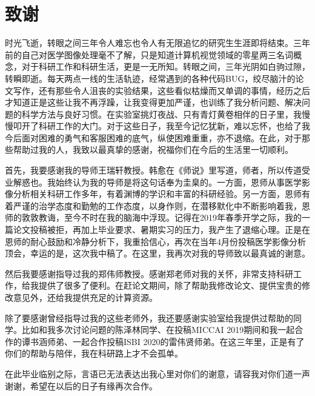 \chapter{致谢}


时光飞逝，转眼之间三年令人难忘也令人有无限追忆的研究生生涯即将结束。三年前的自己对医学图像处理毫不了解，只是知道计算机视觉领域的零星两三名词概念，对于科研工作和科研生活，更是一无所知。转眼之间，三年光阴如白驹过隙，转瞬即逝。每天两点一线的生活轨迹，经常遇到的各种代码BUG，绞尽脑汁的论文写作，还有那些令人沮丧的实验结果，这些看似枯燥而又单调的事情，经历之后才知道正是这些让我不再浮躁，让我变得更加严谨，也训练了我分析问题、解决问题的科学方法与良好习惯。在实验室挑灯夜战、只有青灯黄卷相伴的日子里，我慢慢叩开了科研工作的大门。对于这些日子，我至今记忆犹新，难以忘怀，也给了我今后面对困难的勇气和客服困难的底气，纵使困难重重，亦不退缩。在此，对于那些帮助过我的人，我致以最真挚的感谢，祝福你们在今后的生活里一切顺利。

首先，我要感谢我的导师王瑞轩教授。韩愈在《师说》里写道，师者，所以传道受业解惑也。我始终认为我的导师是将这句话奉为圭臬的。一方面，恩师从事医学影像分析相关科研工作多年，有着渊博的学识和丰富的科研经验。另一方面，恩师有着严谨的治学态度和勤勉的工作态度，以身作则，在潜移默化中不断影响着我，恩师的敦敦教诲，至今不时在我的脑海中浮现。记得在2019年春季开学之际，我的一篇论文投稿被拒，再加上毕业要求、暑期实习的压力，我产生了退缩心理。正是在恩师的耐心鼓励和冷静分析下，我重拾信心，再次在当年4月份投稿医学影像分析顶会，幸运的是，这次我中稿了。在这里，我再次对我的导师致以最真诚的谢意。

然后我要感谢指导过我的郑伟师教授。感谢郑老师对我的关怀，非常支持科研工作，给我提供了很多了便利。在赶论文期间，除了帮助我修改论文、提供宝贵的修改意见外，还给我提供充足的计算资源。

除了要感谢曾经指导过我的这些老师外，我还要感谢实验室给我提供过帮助的同学。比如和我多次讨论问题的陈泽林同学、在投稿MICCAI 2019期间和我一起合作的谭书涵师弟、一起合作投稿ISBI 2020的雷伟贤师弟。在这三年里，正是有了你们的帮助与陪伴，我在科研路上才不会孤单。

在此毕业临别之际，言语已无法表达出我心里对你们的谢意，请容我对你们道一声谢谢，希望在以后的日子有缘再次合作。



